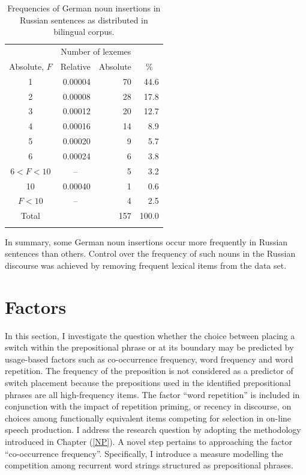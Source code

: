 \begin{table}
\begin{tabular}{crrr}

\lsptoprule
    \multicolumn{2}{c}{Word frequency} & \multicolumn{2}{c}{Number of lexemes}\\\cmidrule(lr){1-2}\cmidrule(lr){3-4}
	Absolute, $F$ & Relative & \multicolumn{1}{c}{Absolute} & \multicolumn{1}{c}{\%} \\\midrule
		1	& 0.00004	& 70	& 44.6\\
		2	& 0.00008	& 28	& 17.8\\
		3	& 0.00012	& 20	& 12.7\\
		4	& 0.00016	& 14	& 8.9\\
		5	& 0.00020	& 9	& 5.7\\
		6	& 0.00024	& 6	& 3.8\\
		$6 < F < 10$ &	\multicolumn{1}{c}{--}	& 5	& 3.2\\
		10	& 0.00040	& 1	& 0.6\\
		$F < 10$	& \multicolumn{1}{c}{--}	& 4	& 2.5\\
		Total	& 	& 157	& 100.0\\  
	\lspbottomrule
\end{tabular}
	\caption{Frequencies of German noun insertions in Russian sentences as distributed in bilingual corpus.\label{tab:5:1}}
\end{table} 

In summary, some German noun insertions occur more frequently in Russian sentences than others. Control over the frequency of such nouns in the Russian discourse was achieved by removing frequent lexical items from the data set.

\section{Factors}

In this section, I investigate the question whether the choice between placing a switch within the prepositional phrase or at its boundary may be predicted by usage-based factors such as co-occurrence frequency, word frequency and word repetition. The frequency of the preposition is not considered as a predictor of switch placement because the prepositions used in the identified prepositional phrases are all high-frequency items. The factor “word repetition” is included in conjunction with the impact of repetition priming, or recency in discourse, on choices among functionally equivalent items competing for selection in on-line speech production. I address the research question by adopting the methodology introduced in Chapter (\ref{NP}). A novel step pertains to approaching the factor “co-occurrence frequency”. Specifically, I introduce a measure modelling the competition among recurrent word strings structured as prepositional phrases.


